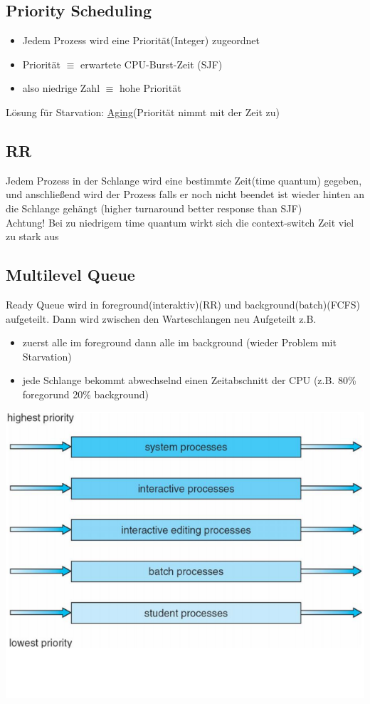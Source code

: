 \documentclass[a4paper]{scrreprt}
\begin{document}
\subsection{Priority Scheduling}
\begin{itemize}
\item Jedem Prozess wird eine Priorität(Integer) zugeordnet
\item Priorität $\equiv$ erwartete CPU-Burst-Zeit (SJF)
\item also niedrige Zahl $\equiv$ hohe Priorität
\end{itemize}
Lösung für Starvation: \underline{Aging}(Priorität nimmt mit der Zeit zu)
\subsection{RR}
Jedem Prozess in der Schlange wird eine bestimmte Zeit(time quantum) gegeben, und anschließend wird der Prozess falls er noch nicht beendet ist wieder hinten an die Schlange gehängt (higher turnaround better response than SJF)\\
Achtung! Bei zu niedrigem time quantum wirkt sich die context-switch Zeit viel zu stark aus
\subsection{Multilevel Queue}
Ready Queue wird in foreground(interaktiv)(RR) und background(batch)(FCFS) aufgeteilt. Dann wird zwischen den Warteschlangen neu Aufgeteilt z.B.
\begin{itemize}
\item zuerst alle im foreground dann alle im background (wieder Problem mit Starvation)
\item jede Schlange bekommt abwechselnd einen Zeitabschnitt der CPU (z.B. 80\% foregorund 20\% background)
\end{itemize}
\includegraphics[scale = 0.5]{graphics/priority.png}
\end{document}
